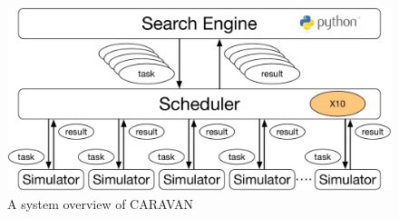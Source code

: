 \begin{figure}
  \centering
  \includegraphics[width=.8\linewidth]{Figs.murase/caravan_overview.pdf}
  \caption{A system overview of CARAVAN}
  \label{fig:caravan_overview}
\end{figure}


